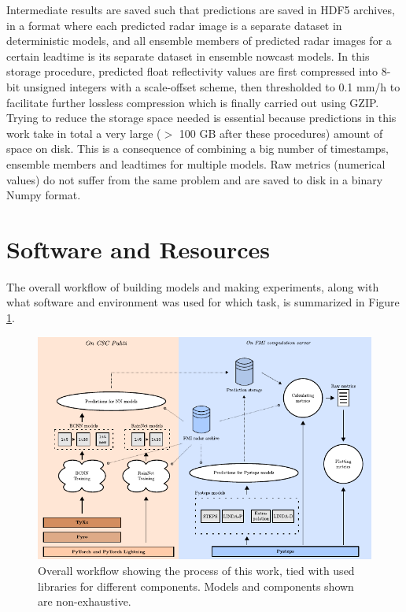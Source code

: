 Intermediate results are saved such that predictions are saved in HDF5 archives, in a format where each predicted radar image is a separate dataset in deterministic models, and all ensemble members of predicted radar images for a certain leadtime is its separate dataset in ensemble nowcast models. In this storage procedure, predicted float reflectivity values are first compressed into 8-bit unsigned integers with a scale-offset scheme, then thresholded to 0.1 mm/h to facilitate further lossless compression which is finally carried out using GZIP. Trying to reduce the storage space needed is essential because predictions in this work take in total a very large ($>$ 100 GB after these procedures) amount of space on disk. This is a consequence of combining a big number of timestamps, ensemble members and leadtimes for multiple models. Raw metrics (numerical values) do not suffer from the same problem and are saved to disk in a binary Numpy format.  

\section{Software and Resources}

\label{section:software}

The overall workflow of building models and making experiments, along with what software and environment was used for which task, is summarized in Figure \ref{fig:workflow}.

\begin{figure}[ht]
	\centering
	\includegraphics[width=\textwidth]{images/workflow/workflow}
	\caption{Overall workflow showing the process of this work, tied with used libraries for different components. Models and components shown are non-exhaustive.}
	\label{fig:workflow}
\end{figure}

